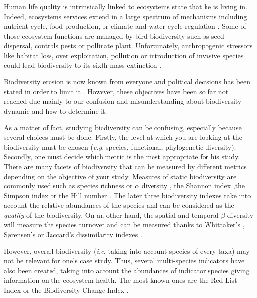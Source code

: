 \documentclass[
  12pt,
  oneside]{report}
\begin{document}
Human life quality is intrinsically linked to ecosystems state that he is living in. Indeed, ecosystems services extend in a large spectrum of mechanisms including nutrient cycle, food production, or climate and water cycle regulation \citep{pereira_global_2012}. Some of those ecosystem functions are managed by bird biodiversity such as seed dispersal, controls pests or pollinate plant. Unfortunately, anthropogenic stressors like habitat loss, over exploitation, pollution or introduction of invasive species could lead biodiversity to its sixth mass extinction \citep{barnosky_has_2011}.

Biodiversity erosion is now known from everyone and political decisions has been stated in order to limit it \citep[\emph{e.g.}][2010, 2002]{the_convention_on_biological_diversity_convention_2021}. However, these objectives have been so far not reached due mainly to our confusion and misunderstanding about biodiversity dynamic and how to determine it.

As a matter of fact, studying biodiversity can be confusing, especially because several choices must be done. Firstly, the level at which you are looking at the biodiversity must be chosen (\emph{e.g.} species, functional, phylogenetic diversity). Secondly, one must decide which metric is the most appropriate for his study. There are many facets of biodiversity that can be measured by different metrics depending on the objective of your study. Measures of static biodiversity are commonly used such as species richness or \(\alpha\) diversity \citep[\emph{i.e.} number of species,][]{whittaker_vegetation_1960}, the Shannon index \citep{shannon_mathematical_1948} ,the Simpson index \citep{simpson_measurement_1949} or the Hill number \citep{hill_diversity_1973}. The later three biodiversity indexes take into account the relative abundances of the species and can be considered as the \emph{quality} of the biodiversity. On an other hand, the spatial and temporal \(\beta\) diversity will measure the species turnover and can be measured thanks to Whittaker's \citep{whittaker_evolution_1972}, Sørensen's \citep{sorensen_method_1948} or Jaccard's \citep{jaccard_distribution_1912} dissimilarity indexes \citep[\emph{e.g.}][]{keil_patterns_2012}.

However, overall biodiversity (\emph{i.e.} taking into account species of every taxa) may not be relevant for one's case study. Thus, several multi-species indicators have also been created, taking into account the abundances of indicator species giving information on the ecosystem health. The most known ones are the Red List Index \citep{butchart_improvements_2007, butchart_using_2005, butchart_measuring_2004} or the Biodiversity Change Index \citep{normander_indicator_2012}.
\end{document}
